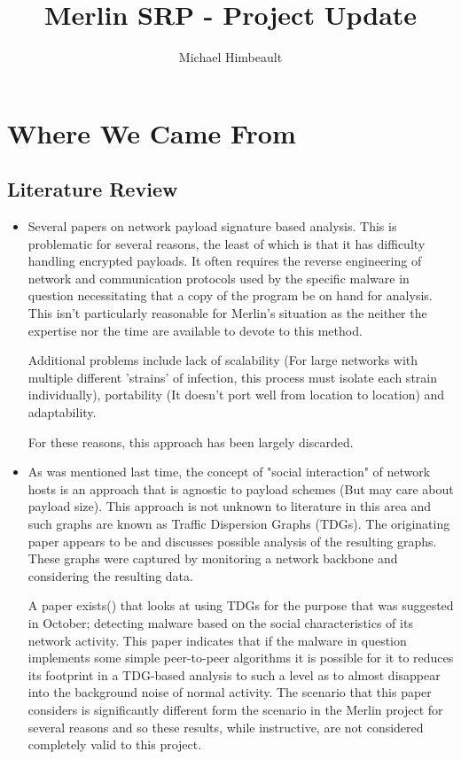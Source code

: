 \documentclass{article}
\theoremstyle{remark}
\theoremstyle{definition}
\theoremstyle{definition}
\theoremstyle{definition}
\begin{document}

\title{Merlin SRP - Project Update}
\author{Michael Himbeault}

\maketitle

\section{Where We Came From}
\subsection{Literature Review}
\begin{itemize}
\item Several papers on network payload signature based analysis. This is problematic for several reasons, the least of which is that it has difficulty handling encrypted payloads. It often requires the reverse engineering of network and communication protocols used by the specific malware in question necessitating that a copy of the program be on hand for analysis. This isn't particularly reasonable for Merlin's situation as the neither the expertise nor the time are available to devote to this method.

    Additional problems include lack of scalability (For large networks with multiple different 'strains' of infection, this process must isolate each strain individually), portability (It doesn't port well from location to location) and adaptability.

    For these reasons, this approach has been largely discarded.

\item As was mentioned last time, the concept of "social interaction" of network hosts is an approach that is agnostic to payload schemes (But may care about payload size). This approach is not unknown to literature in this area and such graphs are known as Traffic Dispersion Graphs (TDGs). The originating paper appears to be \cite{TDG} and discusses possible analysis of the resulting graphs. These graphs were captured by monitoring a network backbone and considering the resulting data.

    A paper exists(\cite{TDG2}) that looks at using TDGs for the purpose that was suggested in October; detecting malware based on the social characteristics of its network activity. This paper indicates that if the malware in question implements some simple peer-to-peer algorithms it is possible for it to reduces its footprint in a TDG-based analysis to such a level as to almost disappear into the background noise of normal activity. The scenario that this paper considers is significantly different form the scenario in the Merlin project for several reasons and so these results, while instructive, are not considered completely valid to this project.
\end{itemize}
\end{document}

